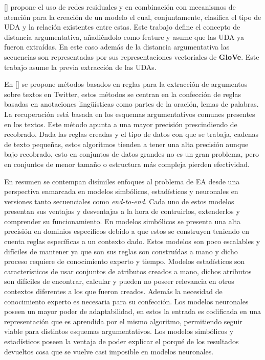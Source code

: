 [\cite{galassi2018argumentative}] propone el uso de redes residuales y en combinación con mecanismos de atención
para la creación de un modelo el cual, conjuntamente, clasifica el tipo de UDA y la relación existentes entre estas.
Este trabajo define el concepto de distancia argumentativa, añadiéndolo como feature y asume que las UDA ya fueron 
extraídas. En este caso además de la distancia argumentativa las secuencias son representadas por sus representaciones
vectoriales de \textbf{GloVe}. Este trabajo asume la previa extracción de las UDAs.

En [\cite{dykes2020reconstructing}] se propone métodos basados en reglas para la extracción de argumentos sobre
textos en Twitter, estos métodos se centran en la confección de reglas basadas en anotaciones lingüísticas como
partes de la oración, lemas de palabras. La recuperación está basada en los esquemas argumentativos comunes presentes
en los textos. Este método apunta a una mayor precisión prescindiendo de recobrado. Dada las reglas creadas y el tipo
de datos con que se trabaja, cadenas de texto pequeñas, estos algoritmos tienden a tener una alta precisión aunque 
bajo recobrado, esto en conjuntos de datos grandes no es un gran problema, pero en conjuntos de menor tamaño o estructura 
más compleja pierden efectividad.

En resumen se contempan disímiles enfoques al problema de EA desde una perspectiva enmarcada en modelos 
simbólicos, estadísticos y neuronales en versiones tanto secuenciales como \emph{end-to-end}. 
Cada uno de estos modelos presentan sus ventajas y desventajas a la hora de contruirlos, 
extenderlos y comprender su funcionamiento. En modelos simbólicos se presenta una alta
precisión en dominios específicos debido a que estos se construyen teniendo en cuenta reglas específicas a un
contexto dado. Estos modelos son poco escalables y difíciles de mantener ya que son sus reglas son construídas
a mano y dicho proceso requiere de conocimiento experto y tiempo. Modelos estadísticos son
característicos de usar conjuntos de atributos creados a mano, dichos atributos son difíciles
de encontrar, calcular y pueden no poseer relevancia en otros contextos diferentes a los que fueron creados. 
Además la necesidad de conocimiento experto es necesaria para su confección. Los modelos neuronales poseen
un mayor poder de adaptabilidad, en estos la entrada es codificada en una representación que es aprendida por
el mismo algoritmo, permitiendo seguir viable para distintos esquemas argumentativos. Los modelos simbólicos y 
estadísticos poseen la ventaja de poder explicar el porqué de los resultados devueltos cosa que se vuelve casi
imposible en modelos neuronales.


